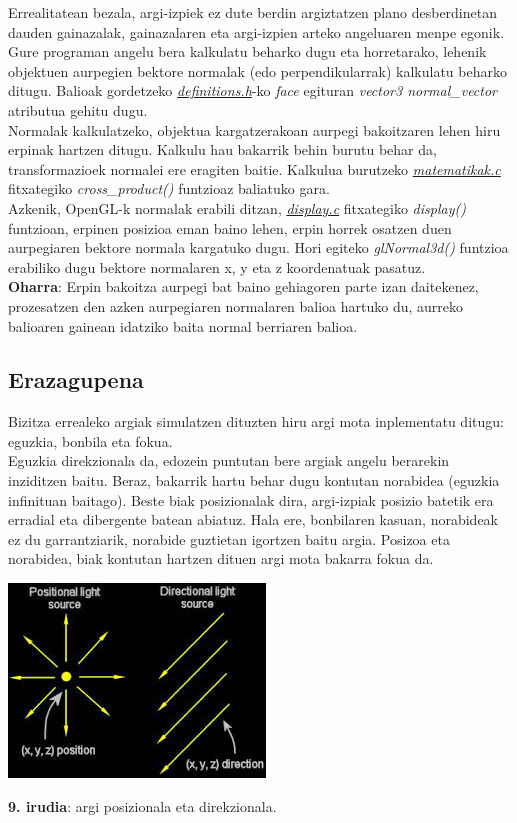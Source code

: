 \documentclass[12pt]{article}
\newcommand{\fitxategi}[1] {\underline{\textit{#1}}}
\newcommand{\metodo}[1] {\textit{#1}}
\newcommand{\aldagai}[1] {\textit{#1}}
\begin{document}
Errealitatean bezala, argi-izpiek ez dute berdin argiztatzen plano desberdinetan dauden gainazalak, gainazalaren eta argi-izpien arteko angeluaren menpe egonik. Gure programan angelu bera kalkulatu beharko dugu eta horretarako, lehenik objektuen aurpegien bektore normalak (edo perpendikularrak) kalkulatu beharko ditugu. Balioak gordetzeko \fitxategi{definitions.h}-ko \aldagai{face} egituran \aldagai{vector3 normal\_vector} atributua gehitu dugu.\\

Normalak kalkulatzeko, objektua kargatzerakoan aurpegi bakoitzaren lehen hiru erpinak hartzen ditugu. Kalkulu hau bakarrik behin burutu behar da, transformazioek normalei ere eragiten baitie. Kalkulua burutzeko \fitxategi{matematikak.c} fitxategiko \metodo{cross\_product()} funtzioaz baliatuko gara.\\

Azkenik, OpenGL-k normalak erabili ditzan, \fitxategi{display.c} fitxategiko \metodo{display()} funtzioan, erpinen posizioa eman baino lehen, erpin horrek osatzen duen aurpegiaren bektore normala kargatuko dugu. Hori egiteko \metodo{glNormal3d()} funtzioa erabiliko dugu bektore normalaren x, y eta z koordenatuak pasatuz.\\

\textbf{Oharra}: Erpin bakoitza aurpegi bat baino gehiagoren parte izan daitekenez, prozesatzen den azken aurpegiaren normalaren balioa hartuko du, aurreko balioaren gainean idatziko baita normal berriaren balioa.
 
\subsection{Erazagupena}

Bizitza errealeko argiak simulatzen dituzten hiru argi mota inplementatu ditugu: eguzkia, bonbila eta fokua.\\

Eguzkia direkzionala da, edozein puntutan bere argiak angelu berarekin inziditzen baitu. Beraz, bakarrik hartu behar dugu kontutan norabidea (eguzkia infinituan baitago). Beste biak posizionalak dira, argi-izpiak posizio batetik era erradial eta dibergente batean abiatuz. Hala ere, bonbilaren kasuan, norabideak ez du garrantziarik, norabide guztietan igortzen baitu argia. Posizoa eta norabidea, biak kontutan hartzen dituen argi mota bakarra fokua da.

\begin{center}
\includegraphics[scale=0.6]{argia_posdirek.jpeg}

\textbf{9. irudia}: argi posizionala eta direkzionala.
\end{center}
\end{document}
